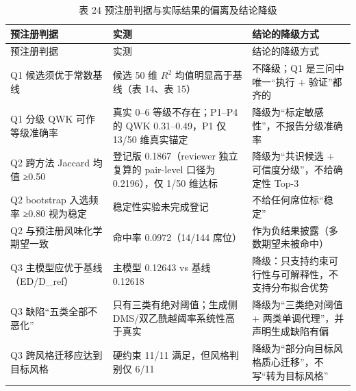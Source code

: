 \documentclass[
  a4paper,12pt]{article}
\begin{document}
\begin{longtable}[]{@{}
  >{\raggedright\arraybackslash}p{}
  >{\raggedright\arraybackslash}p{}
  >{\raggedright\arraybackslash}p{}@{}}
\caption{表 24 预注册判据与实际结果的偏离及结论降级}\tabularnewline
\toprule\noalign{}
\begin{minipage}[b]{\linewidth}\raggedright
预注册判据
\end{minipage} & \begin{minipage}[b]{\linewidth}\raggedright
实测
\end{minipage} & \begin{minipage}[b]{\linewidth}\raggedright
结论的降级方式
\end{minipage} \\
\midrule\noalign{}
\endfirsthead
\toprule\noalign{}
\begin{minipage}[b]{\linewidth}\raggedright
预注册判据
\end{minipage} & \begin{minipage}[b]{\linewidth}\raggedright
实测
\end{minipage} & \begin{minipage}[b]{\linewidth}\raggedright
结论的降级方式
\end{minipage} \\
\midrule\noalign{}
\endhead
\bottomrule\noalign{}
\endlastfoot
Q1 候选须优于常数基线 & 候选 50 维 \(R^2\) 均值明显高于基线（表 14、表
15） & 不降级；Q1 是三问中唯一``执行 + 验证''都齐的 \\
Q1 分级 QWK 可作等级准确率 & 真实 0--6 等级不存在；P1--P4 的 QWK
0.31--0.49，P1 仅 13/50 维真实锚定 &
降级为``标定敏感性''，不报告分级准确率 \\
Q2 跨方法 Jaccard 均值 ≥0.50 & 登记版 0.1867（reviewer 独立复算的
pair-level 口径为 0.2196），仅 1/50 维达标 & 降级为``共识候选 +
可信度分级''，不给确定性 Top-3 \\
Q2 bootstrap 入选频率 ≥0.80 视为稳定 & 稳定性实验未完成登记 &
不给任何席位标``稳定'' \\
Q2 与预注册风味化学期望一致 & 命中率 0.0972（14/144 席位） &
作为负结果披露（多数期望未被命中） \\
Q3 主模型应优于基线（ED/D\_ref） & 主模型 0.12643 vs 基线 0.12618 &
降级：只支持约束可行性与可解释性，不支持分布拟合优势 \\
Q3 缺陷``五类全部不恶化'' & 只有三类有绝对阈值；生成侧
DMS/双乙酰越阈率系统性高于真实 & 降级为``三类绝对阈值 +
两类单调代理''，并声明生成缺陷有偏 \\
Q3 跨风格迁移应达到目标风格 & 硬约束 11/11 满足，但风格判别仅 6/11 &
降级为``部分向目标风格质心迁移''，不写``转为目标风格'' \\
\end{longtable}
\end{document}
